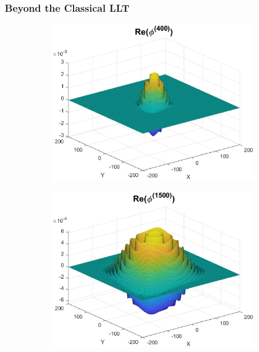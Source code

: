 \documentclass{beamer}
\theoremstyle{definition}
\begin{document}
\begin{frame}
\frametitle{Beyond the Classical LLT}


\begin{figure}[!htb]
\begin{subfigure}{0.495\textwidth}
	\centering
	\includegraphics[width=\textwidth]{Real_400.eps}
\end{subfigure}
\begin{subfigure}{0.495\textwidth}
	\centering
	\includegraphics[width=\textwidth]{Real_1500.eps}
\end{subfigure}
\end{figure}


\end{frame}
\end{document}
